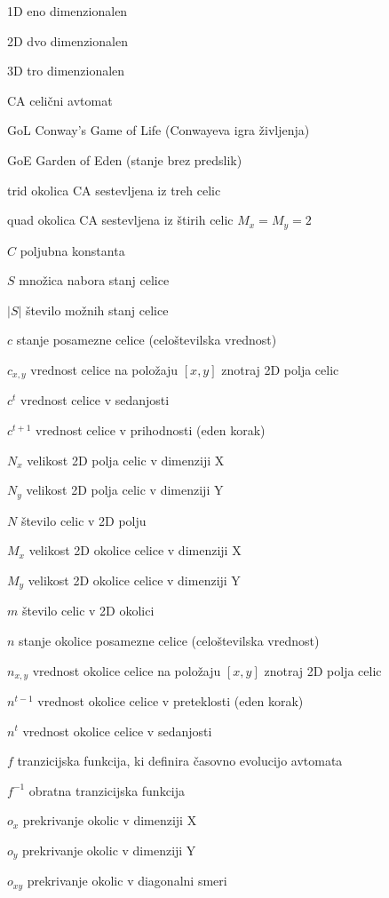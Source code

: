 \documentclass[12pt,a4paper,openany,twoside]{book}
\newcommand{\abbrlabel}[1]{\makebox[3cm][l]{\textbf{#1}\ \dotfill}}
\newenvironment{abbreviations}{\begin{list}{}{\renewcommand{\makelabel}{\abbrlabel}}}{\end{list}}
\begin{document}
\begin{abbreviations}
\item[1D] eno dimenzionalen
\item[2D] dvo dimenzionalen
\item[3D] tro dimenzionalen
\item[CA] celični avtomat
\item[GoL] Conway's Game of Life (Conwayeva igra življenja)
\item[GoE] Garden of Eden (stanje brez predslik)
\item[trid] okolica CA sestevljena iz treh celic
\item[quad] okolica CA sestevljena iz štirih celic \(M_x=M_y=2\)

\item[\(C\)] poljubna konstanta
\item[\(S\)] množica nabora stanj celice
\item[\(|S|\)] število možnih stanj celice
\item[\(c\)] stanje posamezne celice (celoštevilska vrednost)
\item[\(c_{x,y}\)] vrednost celice na položaju \([x,y]\) znotraj 2D polja celic
\item[\(c^t\)] vrednost celice v sedanjosti
\item[\(c^{t+1}\)] vrednost celice v prihodnosti (eden korak)
\item[\(N_x\)] velikost 2D polja celic v dimenziji X
\item[\(N_y\)] velikost 2D polja celic v dimenziji Y
\item[\(N\)] število celic v 2D polju
\item[\(M_x\)] velikost 2D okolice celice v dimenziji X
\item[\(M_y\)] velikost 2D okolice celice v dimenziji Y
\item[\(m\)] število celic v 2D okolici
\item[\(n\)] stanje okolice posamezne celice (celoštevilska vrednost)
\item[\(n_{x,y}\)] vrednost okolice celice na položaju \([x,y]\) znotraj 2D polja celic
\item[\(n^{t-1}\)] vrednost okolice celice v preteklosti (eden korak)
\item[\(n^t\)] vrednost okolice celice v sedanjosti
\item[\(f\)] tranzicijska funkcija, ki definira časovno evolucijo avtomata
\item[\(f^{-1}\)] obratna tranzicijska funkcija
\item[\(o_x\)] prekrivanje okolic v dimenziji X
\item[\(o_y\)] prekrivanje okolic v dimenziji Y
\item[\(o_{xy}\)] prekrivanje okolic v diagonalni smeri
\end{abbreviations}
\end{document}
